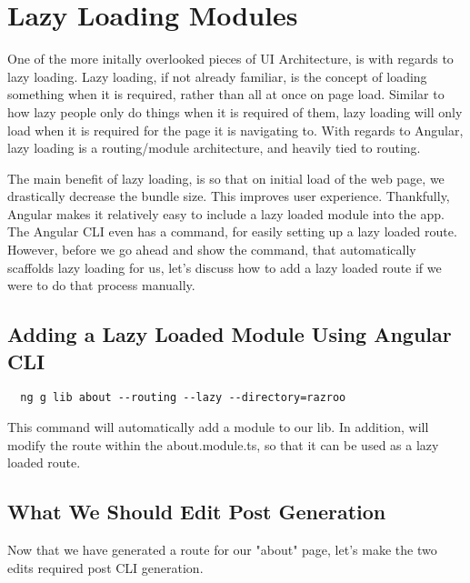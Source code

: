 
\chapter{ Lazy Loading Modules }
One of the more initally overlooked pieces of UI Architecture, is with regards to 
lazy loading. Lazy loading, if not already familiar, is the concept of loading
something when it is required, rather than all at once on page load. Similar to 
how lazy people only do things when it is required of them, lazy loading will 
only load when it is required for the page it is navigating to. With regards to Angular,
lazy loading is a routing/module architecture, and heavily tied to routing. 

The main benefit of lazy loading, is so that on initial load of the web page, we
drastically decrease the bundle size. This improves user experience. Thankfully, Angular 
makes it relatively easy to include a lazy loaded module into the app. The Angular CLI 
even has a command, for easily setting up a lazy loaded route. However, before we go 
ahead and show the command, that automatically scaffolds lazy loading for us, let's discuss
how to add a lazy loaded route if we were to do that process manually. 

\section{Adding a Lazy Loaded Module Using Angular CLI}
\begin{verbatim}
  ng g lib about --routing --lazy --directory=razroo
\end{verbatim}

This command will automatically add a module to our lib. In addition, will 
modify the route within the about.module.ts, so that it can be used as a
lazy loaded route. 


\section{What We Should Edit Post Generation}
Now that we have generated a route for our "about" page, let's make the two 
edits required post CLI generation. 

